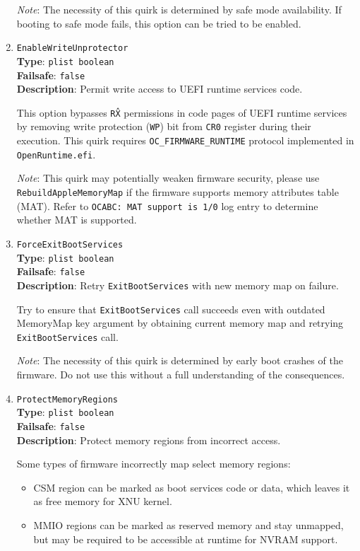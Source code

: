 \documentclass[]{article}
\providecommand{\tightlist}{%
  \setlength{\itemsep}{0pt}\setlength{\parskip}{0pt}}
\begin{document}
\begin{enumerate}
  \emph{Note}: The necessity of this quirk is determined by safe mode availability. If
  booting to safe mode fails, this option can be tried to be enabled.

\item
  \texttt{EnableWriteUnprotector}\\
  \textbf{Type}: \texttt{plist\ boolean}\\
  \textbf{Failsafe}: \texttt{false}\\
  \textbf{Description}: Permit write access to UEFI runtime services code.

  This option bypasses \texttt{R\^X} permissions in code pages of UEFI runtime
  services by removing write protection (\texttt{WP}) bit from \texttt{CR0}
  register during their execution. This quirk requires \texttt{OC\_FIRMWARE\_RUNTIME}
  protocol implemented in \texttt{OpenRuntime.efi}.

  \emph{Note}: This quirk may potentially weaken firmware security, please use
  \texttt{RebuildAppleMemoryMap} if the firmware supports memory attributes table (MAT).
  Refer to \texttt{OCABC: MAT support is 1/0} log entry to determine whether MAT is supported.

\item
  \texttt{ForceExitBootServices}\\
  \textbf{Type}: \texttt{plist\ boolean}\\
  \textbf{Failsafe}: \texttt{false}\\
  \textbf{Description}: Retry \texttt{ExitBootServices} with new memory map on failure.

  Try to ensure that \texttt{ExitBootServices} call succeeds even with outdated MemoryMap
  key argument by obtaining current memory map and retrying \texttt{ExitBootServices} call.

  \emph{Note}: The necessity of this quirk is determined by early boot crashes
  of the firmware. Do not use this without a full understanding of the consequences.

\item
  \texttt{ProtectMemoryRegions}\\
  \textbf{Type}: \texttt{plist\ boolean}\\
  \textbf{Failsafe}: \texttt{false}\\
  \textbf{Description}: Protect memory regions from incorrect access.

  Some types of firmware incorrectly map select memory regions:

  \begin{itemize}
    \tightlist
    \item CSM region can be marked as boot services code or data, which
      leaves it as free memory for XNU kernel.
    \item MMIO regions can be marked as reserved memory and stay unmapped,
      but may be required to be accessible at runtime for NVRAM support.
  \end{itemize}


\end{enumerate}
\end{document}
